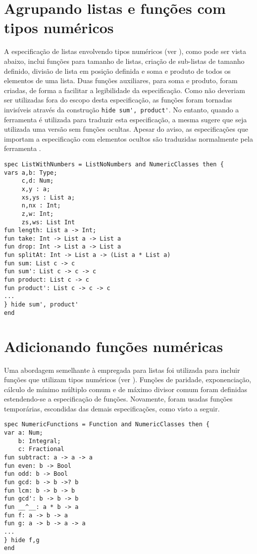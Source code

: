 \section{Agrupando listas e funções com tipos numéricos}
A especificação de listas envolvendo tipos numéricos (ver ), como pode ser vista abaixo, inclui funções para tamanho de listas, criação de sub-listas de tamanho definido, divisão de lista em posição definida e soma e produto de todos os elementos de uma lista.
Duas funções auxiliares, para soma e produto, foram criadas, de forma a facilitar a legibilidade da especificação.
Como não deveriam ser utilizadas fora do escopo desta especificação, as funções foram tornadas invisíveis através da construção \Verb.hide sum', product'..
No entanto, quando a ferramenta \Hets é utilizada para traduzir esta especificação, a mesma sugere que seja utilizada uma versão sem funções ocultas.
Apesar do aviso, as especificações que importam a especificação com elementos ocultos são traduzidas normalmente pela ferramenta \Hets.

\begin{Verbatim}
spec ListWithNumbers = ListNoNumbers and NumericClasses then {
vars a,b: Type;
     c,d: Num;
     x,y : a;
     xs,ys : List a;
     n,nx : Int;
     z,w: Int;
     zs,ws: List Int
fun length: List a -> Int;
fun take: Int -> List a -> List a
fun drop: Int -> List a -> List a
fun splitAt: Int -> List a -> (List a * List a)
fun sum: List c -> c
fun sum': List c -> c -> c
fun product: List c -> c
fun product': List c -> c -> c
...
} hide sum', product'
end
\end{Verbatim}

\section{Adicionando funções numéricas}
Uma abordagem semelhante à empregada para listas foi utilizada para incluir funções que utilizam tipos numéricos (ver ).
Funções de paridade, exponenciação, cálculo de mínimo múltiplo comum e de máximo divisor comum foram definidas estendendo-se a especificação de funções.
Novamente, foram usadas funções temporárias, escondidas das demais especificações, como visto a seguir.

\begin{Verbatim}
spec NumericFunctions = Function and NumericClasses then {
var a: Num;
    b: Integral;
    c: Fractional
fun subtract: a -> a -> a
fun even: b -> Bool
fun odd: b -> Bool
fun gcd: b -> b ->? b
fun lcm: b -> b -> b
fun gcd': b -> b -> b
fun __^__: a * b -> a
fun f: a -> b -> a
fun g: a -> b -> a -> a
...
} hide f,g
end
\end{Verbatim}

